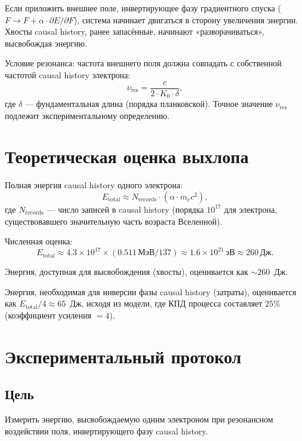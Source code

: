 \documentclass[12pt,a4paper]{article}
\begin{document}
Если приложить внешнее поле, инвертирующее фазу градиентного спуска ($F \to F + \alpha \cdot \partial E/\partial F$), система начинает двигаться в сторону увеличения энергии. Хвосты causal history, ранее запасённые, начинают «разворачиваться», высвобождая энергию.

Условие резонанса: частота внешнего поля должна совпадать с собственной частотой causal history электрона:
\begin{equation}
    \nu_{\text{res}} = \frac{c}{2 \cdot K_0 \cdot \delta},
\end{equation}
где $\delta$ --- фундаментальная длина (порядка планковской). Точное значение $\nu_{\text{res}}$ подлежит экспериментальному определению.

\section{Теоретическая оценка выхлопа}
Полная энергия causal history одного электрона:
\begin{equation}
    E_{\text{total}} \approx N_{\text{records}} \cdot (\alpha \cdot m_e c^2),
\end{equation}
где $N_{\text{records}}$ --- число записей в causal history (порядка $10^{17}$ для электрона, существовавшего значительную часть возраста Вселенной).

Численная оценка:
\begin{equation}
    E_{\text{total}} \approx 4.3 \times 10^{17} \times (0.511\,\text{МэВ} / 137) \approx 1.6 \times 10^{21}\,\text{эВ} \approx 260\,\text{Дж}.
\end{equation}

Энергия, доступная для высвобождения (хвосты), оценивается как $\sim 260$~Дж.

Энергия, необходимая для инверсии фазы causal history (затраты), оценивается как $E_{\text{total}} / 4 \approx 65$~Дж, исходя из модели, где КПД процесса составляет $25\%$ (коэффициент усиления $= 4$).

\section{Экспериментальный протокол}

\subsection{Цель}
Измерить энергию, высвобождаемую одним электроном при резонансном воздействии поля, инвертирующего фазу causal history.
\end{document}
